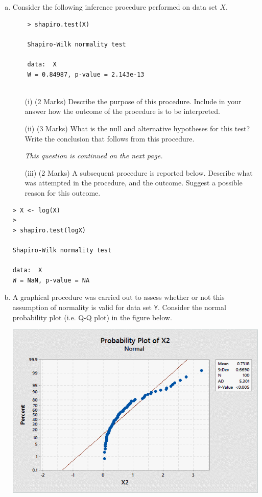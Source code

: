 \documentclass[a4paper,12pt]{article}
\begin{document}
\begin{enumerate}
\begin{enumerate}[(a)]
\item 
Consider the following inference procedure performed on data set $X$.
\begin{framed}
	\begin{verbatim}
	> shapiro.test(X)
	
	Shapiro-Wilk normality test
	
	data:  X
	W = 0.84987, p-value = 2.143e-13
	
	\end{verbatim}
\end{framed}


\begin{itemize}
	\item[(i)] (2 Marks) Describe the purpose of this procedure. Include in your answer how the outcome of the procedure is to be interpreted.
	\item[(ii)] (3 Marks) What is the null and alternative hypotheses for this test? Write the conclusion that follows from this procedure.
\medskip


\noindent \textit{This question is continued on the next page.}
	
\newpage	
\item[(iii)] (2 Marks) A subsequent procedure is reported below. Describe what was attempted in the procedure, and the outcome. Suggest a possible reason for this outcome.
\end{itemize}

\begin{framed}
\begin{verbatim}
> X <- log(X)
>
> shapiro.test(logX)
	
Shapiro-Wilk normality test
	
data:  X
W = NaN, p-value = NA
\end{verbatim}
\end{framed}




\item A graphical procedure was carried out to assess whether or not this assumption of normality is valid for data set \texttt{Y}. Consider the normal probability plot (i.e. Q-Q plot) in the figure below.

\begin{center}
	\includegraphics[scale=0.55]{Q5examQQplot3.png}
\end{center}


\end{enumerate}
\end{enumerate}
\end{document}
